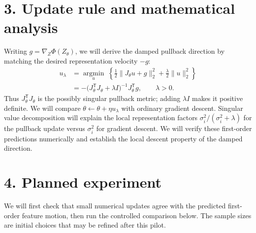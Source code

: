 \documentclass[11pt]{article}
\begin{document}
\section*{3. Update rule and mathematical analysis}

Writing $g=\nabla_Z\Phi(Z_\theta)$, we will derive the damped pullback
direction by matching the desired representation velocity $-g$:
\begin{align*}
 u_\lambda
 &=\underset{u}{\operatorname{argmin}}\;
       \left\{\tfrac12\|J_\theta u+g\|_2^2
       +\tfrac\lambda2\|u\|_2^2\right\}\\
 &=-\bigl(J_\theta^{\mathsf T}J_\theta+\lambda I\bigr)^{-1}
       J_\theta^{\mathsf T}g,\qquad \lambda>0.
\end{align*}
Thus $J_\theta^{\mathsf T}J_\theta$ is the possibly singular pullback metric;
adding $\lambda I$ makes it positive definite. We will compare
$\theta\leftarrow\theta+\eta u_\lambda$
with ordinary gradient descent. Singular value decomposition will explain
the local representation factors $\sigma_i^2/(\sigma_i^2+\lambda)$ for
the pullback update versus $\sigma_i^2$ for gradient descent. We will verify
these first-order predictions numerically and establish the local descent
property of the damped direction.

\section*{4. Planned experiment}

We will first check that small numerical updates agree with the predicted
first-order feature motion, then run the controlled comparison below.
The sample sizes are initial choices that may be refined after this pilot.
\end{document}
